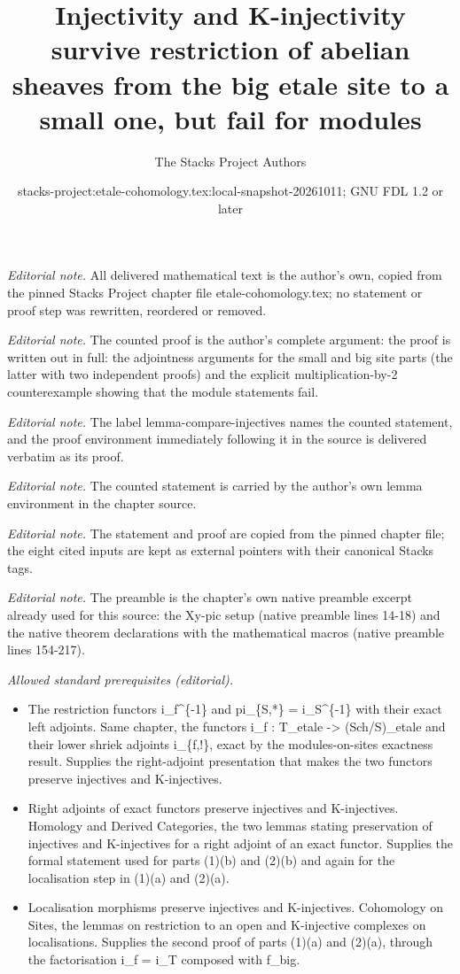 \documentclass[10pt,a4paper]{amsart}
\title{Injectivity and K-injectivity survive restriction of abelian sheaves from the big etale site to a small one, but fail for modules}
\author{The Stacks Project Authors}
\date{stacks-project:etale-cohomology.tex:local-snapshot-20261011; GNU FDL 1.2 or later}
\theoremstyle{plain}
\theoremstyle{definition}
\theoremstyle{remark}
\numberwithin{equation}{subsection}
\begin{document}
\maketitle
\noindent\textit{Editorial note.} All delivered mathematical text is the author's own, copied from the pinned Stacks Project chapter file etale-cohomology.tex; no statement or proof step was rewritten, reordered or removed.\par\medskip
\noindent\textit{Editorial note.} The counted proof is the author's complete argument: the proof is written out in full: the adjointness arguments for the small and big site parts (the latter with two independent proofs) and the explicit multiplication-by-2 counterexample showing that the module statements fail.\par\medskip
\noindent\textit{Editorial note.} The label lemma-compare-injectives names the counted statement, and the proof environment immediately following it in the source is delivered verbatim as its proof.\par\medskip
\noindent\textit{Editorial note.} The counted statement is carried by the author's own lemma environment in the chapter source.\par\medskip
\noindent\textit{Editorial note.} The statement and proof are copied from the pinned chapter file; the eight cited inputs are kept as external pointers with their canonical Stacks tags.\par\medskip
\noindent\textit{Editorial note.} The preamble is the chapter's own native preamble excerpt already used for this source: the Xy-pic setup (native preamble lines 14-18) and the native theorem declarations with the mathematical macros (native preamble lines 154-217).\par\medskip
\noindent\textit{Allowed standard prerequisites (editorial).}\begin{itemize}
\item The restriction functors i\_f\textasciicircum{}\{-1\} and pi\_\{S,*\} = i\_S\textasciicircum{}\{-1\} with their exact left adjoints. Same chapter, the functors i\_f : T\_etale -> (Sch/S)\_etale and their lower shriek adjoints i\_\{f,!\}, exact by the modules-on-sites exactness result. Supplies the right-adjoint presentation that makes the two functors preserve injectives and K-injectives.
\item Right adjoints of exact functors preserve injectives and K-injectives. Homology and Derived Categories, the two lemmas stating preservation of injectives and K-injectives for a right adjoint of an exact functor. Supplies the formal statement used for parts (1)(b) and (2)(b) and again for the localisation step in (1)(a) and (2)(a).
\item Localisation morphisms preserve injectives and K-injectives. Cohomology on Sites, the lemmas on restriction to an open and K-injective complexes on localisations. Supplies the second proof of parts (1)(a) and (2)(a), through the factorisation i\_f = i\_T composed with f\_big.
\end{itemize}\medskip
\end{document}
